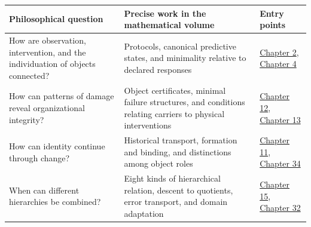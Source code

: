 \documentclass[
  english,
  11pt,
  oneside]{book}
\newcounter{none} %
\begin{document}
{\def\LTcaptype{none} %
\begin{longtable}[]{@{}
  >{\raggedright\arraybackslash}p{}
  >{\raggedright\arraybackslash}p{}
  >{\raggedright\arraybackslash}p{}@{}}
\toprule\noalign{}
\begin{minipage}[b]{\linewidth}\raggedright
Philosophical question
\end{minipage} & \begin{minipage}[b]{\linewidth}\raggedright
Precise work in the mathematical volume
\end{minipage} & \begin{minipage}[b]{\linewidth}\raggedright
Entry points
\end{minipage} \\
\midrule\noalign{}
\endhead
\bottomrule\noalign{}
\endlastfoot
How are observation, intervention, and the individuation of objects connected? & Protocols, canonical predictive states, and minimality relative to declared responses & \href{https://github.com/MurphyHoops/UEOT/blob/3d443ec29eb17af1fc00699a74e2d42d73516d81/mathematics/UEOT_MATHEMATICS.en.md\#ch-2}{Chapter 2}, \href{https://github.com/MurphyHoops/UEOT/blob/3d443ec29eb17af1fc00699a74e2d42d73516d81/mathematics/UEOT_MATHEMATICS.en.md\#ch-4}{Chapter 4} \\
How can patterns of damage reveal organizational integrity? & Object certificates, minimal failure structures, and conditions relating carriers to physical interventions & \href{https://github.com/MurphyHoops/UEOT/blob/3d443ec29eb17af1fc00699a74e2d42d73516d81/mathematics/UEOT_MATHEMATICS.en.md\#ch-12}{Chapter 12}, \href{https://github.com/MurphyHoops/UEOT/blob/3d443ec29eb17af1fc00699a74e2d42d73516d81/mathematics/UEOT_MATHEMATICS.en.md\#ch-13}{Chapter 13} \\
How can identity continue through change? & Historical transport, formation and binding, and distinctions among object roles & \href{https://github.com/MurphyHoops/UEOT/blob/3d443ec29eb17af1fc00699a74e2d42d73516d81/mathematics/UEOT_MATHEMATICS.en.md\#ch-11}{Chapter 11}, \href{https://github.com/MurphyHoops/UEOT/blob/3d443ec29eb17af1fc00699a74e2d42d73516d81/mathematics/UEOT_MATHEMATICS.en.md\#ch-34}{Chapter 34} \\
When can different hierarchies be combined? & Eight kinds of hierarchical relation, descent to quotients, error transport, and domain adaptation & \href{https://github.com/MurphyHoops/UEOT/blob/3d443ec29eb17af1fc00699a74e2d42d73516d81/mathematics/UEOT_MATHEMATICS.en.md\#ch-15}{Chapter 15}, \href{https://github.com/MurphyHoops/UEOT/blob/3d443ec29eb17af1fc00699a74e2d42d73516d81/mathematics/UEOT_MATHEMATICS.en.md\#ch-32}{Chapter 32} \\

\end{longtable}}
\end{document}
